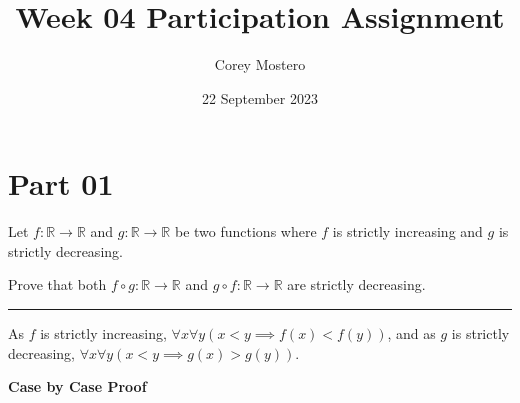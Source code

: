 \documentclass{article}
\title{Week 04 Participation Assignment}
\date{22 September 2023}
\author{Corey Mostero}
\begin{document}
\newcommand{\hr}{\par\noindent\rule{\textwidth}{0.4pt}}

\newcommand{\bc}[1]{
	\begin{equation*}
		\begin{boxed}
			{#1}
		\end{boxed}
	\end{equation*}
}

\newcommand{\cond}[2]{
	\ifmmode
	{#1} \quad {#2}
	\else
	$$ {#1} \quad {#2} $$
	\fi
}

\newcommand{\matr}[1]{
	\ifmmode \bm{#1}
	\else \textit{\textbf{#1}}
	\fi
}
\newcommand{\vect}[1]{
	\ifmmode \mathbf{#1}
	\else \textbf{#1}
	\fi
}


\maketitle
\newpage

\tableofcontents

\section{Part 01}

Let $ f: \mathbb{R} \rightarrow \mathbb{R} $ and $ g: \mathbb{R} \rightarrow \mathbb{R} $ be two functions where $ f $ is strictly increasing and $ g $ is strictly decreasing.

Prove that both $ f \circ g: \mathbb{R} \rightarrow \mathbb{R} $ and $ g \circ f: \mathbb{R} \rightarrow \mathbb{R} $ are strictly decreasing.

\hr

As $ f $ is strictly increasing, $ \forall x \forall y \left( x < y \implies f(x) < f(y) \right) $, and as $ g $ is strictly decreasing, $ \forall x \forall y \left( x < y \implies g(x) > g(y) \right) $.

\textbf{Case by Case Proof}
\end{document}
